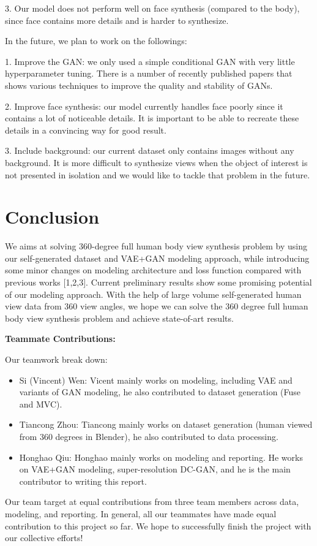 \documentclass[10pt,conference]{IEEEtran}
\begin{document}
3. Our model does not perform well on face synthesis (compared to the body), since face contains more details and is harder to synthesize.

In the future, we plan to work on the followings:

1. Improve the GAN: we only used a simple conditional GAN with very little hyperparameter tuning. There is a number of recently published papers that shows various techniques to improve the quality and stability of GANs.

2. Improve face synthesis: our model currently handles face poorly since it contains a lot of noticeable details. It is important to be able to recreate these details in a convincing way for good result. 

3. Include background: our current dataset only contains images without any background. It is more difficult to synthesize views when the object of interest is not presented in isolation and we would like to tackle that problem in the future.


\section{Conclusion}
We aims at solving 360-degree full human body view synthesis problem by using our self-generated dataset and VAE+GAN modeling approach, while introducing some minor changes on modeling architecture and loss function compared with previous works [1,2,3].
Current preliminary results show some promising potential of our modeling approach. With the help of large volume self-generated human view data from 360 view angles, we hope we can solve the 360 degree full human body view synthesis problem and achieve state-of-art results.

\textbf{Teammate Contributions:}

Our teamwork break down:
\begin{itemize}
\item Si (Vincent) Wen: Vicent mainly works on modeling, including VAE and variants of GAN modeling, he also contributed to dataset generation (Fuse and MVC).
\item Tiancong Zhou: Tiancong mainly works on dataset generation (human viewed from 360 degrees in Blender), he also contributed to data processing.
\item Honghao Qiu: Honghao mainly works on modeling and reporting. He works on VAE+GAN modeling, super-resolution DC-GAN, and he is the main contributor to writing this report.
\end{itemize}

Our team target at equal contributions from three team members across data, modeling, and reporting.  In general, all our teammates have made equal contribution to this project so far. We hope to successfully finish the project with our collective efforts!


\printbibliography
\end{document}
